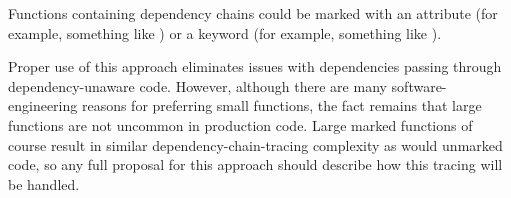 Functions containing dependency chains could be marked with
an attribute (for example, something like
) or
a keyword (for example, something like
).

Proper use of this approach eliminates issues with dependencies passing
through dependency-unaware code.
However, although there are many software-engineering reasons for
preferring small functions, the fact remains that large functions
are not uncommon in production code.
Large marked functions of course result in similar dependency-chain-tracing
complexity as would unmarked code, so any full proposal for this approach
should describe how this tracing will be handled.
